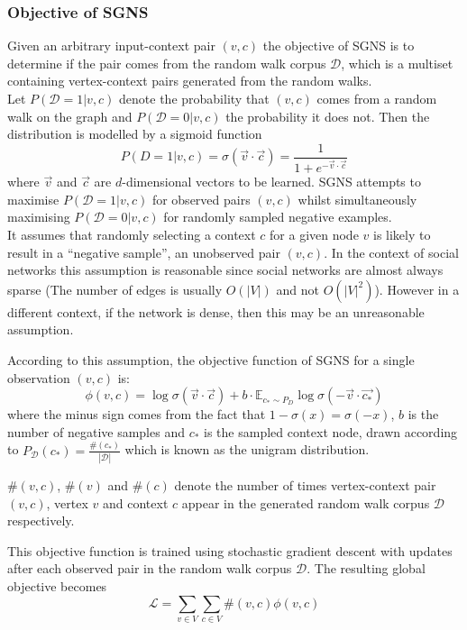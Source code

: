 \documentclass[a4paper]{article}
\renewcommand{\E}{\mathbb E}
\newcommand{\D}{\mathcal D}
\begin{document}
\subsubsection{Objective of SGNS}
Given an arbitrary input-context pair $(v,c)$ the objective of SGNS is to determine if
the pair comes from the random walk corpus $\mathcal{D}$, which is a multiset containing vertex-context pairs generated from the random walks.\\
Let $P(\D = 1 | v, c)$ denote the probability that $(v,c)$ comes from a random
walk on the graph and $P(\D = 0| v, c)$
the probability it does not. Then the distribution is modelled by a sigmoid
function
\[P(D = 1 | v, c) = \sigma(\vec{v} \cdot \vec{c}) = \frac{1}{1 + e^{-\vec{v} \cdot \vec{c}}}\]
where $\vec{v}$ and $\vec{c}$ are $d$-dimensional vectors to be learned. SGNS attempts to maximise $P(\mathcal{D} = 1 | v,c)$ for observed pairs $(v, c)$
whilst simultaneously maximising $P(\D = 0 | v, c)$ for randomly sampled
negative examples.\\
It assumes that randomly selecting a context $c$ for a given
node $v$ is likely to result in a ``negative sample'', an unobserved pair $(v,c)$. In the context of
social networks this assumption is reasonable since social networks are almost
always sparse (The number of edges is usually $O(|V|)$ and not $O(|V|^2)$). However in a different
context, if the network is dense, then this may be an unreasonable assumption.

According to this assumption, the objective function of SGNS for a single
observation $(v,c)$ is:
\begin{equation}
\phi(v, c) = \log{\sigma(\vec{v} \cdot \vec{c})} + b \cdot \E_{c_* \sim P_D}\log{\sigma(-\vec{v} \cdot \vec{c_*})}
\end{equation}
where the minus sign comes from the fact that $1 - \sigma(x) = \sigma(-x)$, $b$
is the number of negative samples and $c_*$ is the sampled context node, drawn
according to $P_{\D} (c_*) = \frac{\#(c_*)}{| \D |}$ which is known as the unigram
distribution.\\
\begin{notation} $\#(v,c)$, $\#(v)$ and $\#(c)$ denote the number of times vertex-context pair
  $(v,c)$, vertex $v$ and context $c$ appear in the generated random walk corpus
  $\mathcal{D}$ respectively.
\end{notation}
\noindent This objective function is trained using stochastic gradient descent with
updates after each  observed pair in the random walk corpus $\D$. The resulting
global objective becomes
\begin{equation*}
  \mathcal{L} = \sum_{v \in V} \sum_{c \in V} \#(v,c)\phi(v, c)
\end{equation*}
\end{document}
